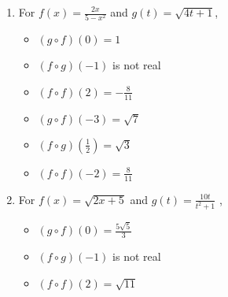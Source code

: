 \documentclass{ximera}
\begin{document}
\begin{enumerate}
\begin{multicols}{3}
\begin{itemize}
\end{itemize}

\end{multicols}

\item  For  $f(x) = \frac{2x}{5-x^2}$ and $g(t) = \sqrt{4t+1}$,
\begin{multicols}{3}

\begin{itemize}

\item  $(g\circ f)(0) = 1$

\item  $(f\circ g)(-1)$ is not real

\item  $(f \circ f)(2) = -\frac{8}{11}$

\end{itemize}

\end{multicols}

\begin{multicols}{3}

\begin{itemize}

\item  $(g\circ f)(-3) = \sqrt{7}$

\item  $(f\circ g)\left(\frac{1}{2}\right) = \sqrt{3}$

\item  $(f \circ f)(-2) = \frac{8}{11}$

\end{itemize}

\end{multicols}

\item  For  $f(x) =\sqrt{2x+5}$ and $g(t) = \frac{10t}{t^2+1}$ ,
\begin{multicols}{3}

\begin{itemize}

\item  $(g\circ f)(0) = \frac{5\sqrt{5}}{3}$

\item  $(f\circ g)(-1)$ is not real

\item  $(f \circ f)(2) = \sqrt{11}$

\end{itemize}

\end{multicols}


\end{enumerate}
\end{document}
